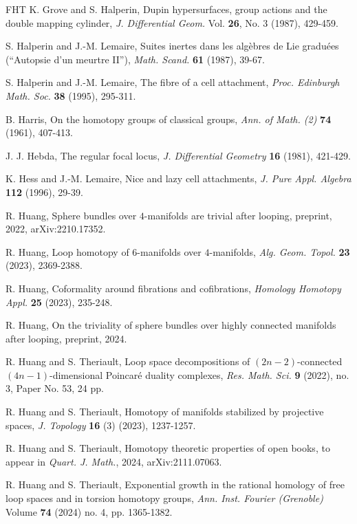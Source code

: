 \documentclass[a4]{amsart}
\theoremstyle{definition}
\begin{document}
\begin{sloppypar}
\begin{thebibliography}{FHT}
 K. Grove and S. Halperin, Dupin hypersurfaces, group actions and the double mapping cylinder, 
\emph{J. Differential Geom.} Vol. \textbf{26}, No. 3 (1987), 429-459.

 S. Halperin and J.-M. Lemaire, Suites inertes dans les alg\`{e}bres de Lie gradu\'{e}es (``Autopsie d'un meurtre II''), \emph{Math. Scand.} \textbf{61} (1987), 39-67.

 S. Halperin and J.-M. Lemaire, The fibre of a cell attachment, \emph{Proc. Edinburgh Math. Soc.} \textbf{38} (1995), 295-311.

 B. Harris, On the homotopy groups of classical groups, \emph{Ann. of Math. (2)} \textbf{74} (1961), 407-413. 

 J. J. Hebda, The regular focal locus, \emph{J. Differential Geometry} \textbf{16} (1981), 421-429.

 K. Hess and J.-M. Lemaire, Nice and lazy cell attachments, \emph{J. Pure Appl. Algebra} \textbf{112} (1996), 29-39.

 R. Huang, Sphere bundles over $4$-manifolds are trivial after looping, preprint, 2022, arXiv:2210.17352. 

 R. Huang, Loop homotopy of $6$-manifolds over $4$-manifolds, \emph{Alg. Geom. Topol.} \textbf{23} (2023), 2369-2388.

 R. Huang, Coformality around fibrations and cofibrations, \emph{Homology Homotopy Appl.} \textbf{25} (2023), 235-248.

 R. Huang, On the triviality of sphere bundles over highly connected manifolds after looping, preprint, 2024. 

 R. Huang and S. Theriault, Loop space decompositions of $(2n-2)$-connected $(4n-1)$-dimensional Poincar\'{e} duality complexes, \emph{Res. Math. Sci.} \textbf{9} (2022), no. 3, Paper No. 53, 24 pp.

 R. Huang and S. Theriault, Homotopy of manifolds stabilized by projective spaces, \emph{J. Topology} \textbf{16} (3) (2023), 1237-1257.

 R. Huang and S. Theriault, Homotopy theoretic properties of open books, to appear in \emph{Quart. J. Math.}, 2024, arXiv:2111.07063. 

 R. Huang and S. Theriault, Exponential growth in the rational homology of free loop spaces and in torsion homotopy groups, \emph{Ann. Inst. Fourier (Grenoble)} Volume \textbf{74} (2024) no. 4, pp. 1365-1382.


\end{thebibliography}
\end{sloppypar}
\end{document}

